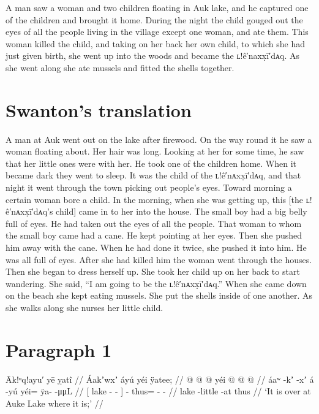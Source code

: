 A man saw a woman and two children floating in Auk lake, and he captured one of the children and brought it home.
During the night the child gouged out the eyes of all the people living in the village except one woman, and ate them.
This woman killed the child, and taking on her back her own child, to which she had just given birth, she went up into the woods and became the ʟ!ê′naxx̣ī′dᴀq.
As she went along she ate mussels and fitted the shells together.

\section{Swanton’s translation}\label{sec:94-swanton-translation}

A man at Auk went out on the lake after firewood.
On the way round it he saw a woman floating about.
Her hair was long.
Looking at her for some time, he saw that her little ones were with her.
He took one of the children home.
When it became dark they went to sleep.
It was the child of the ʟ!ê′nᴀxx̣ī′dᴀq, and that night it went through the town picking out people’s eyes.
Toward morning a certain woman bore a child.
In the morning, when she was getting up, this [the ʟ!ê′nᴀxx̣ī′dᴀq’s child] came in to her into the house.
The small boy had a big belly full of eyes.
He had taken out the eyes of all the people.
That woman to whom the small boy came had a cane.
He kept pointing at her eyes.
Then she pushed him away with the cane.
When he had done it twice, she pushed it into him.
He was all full of eyes.
After she had killed him the woman went through the
houses.
Then she began to dress herself up.
She took her child up on her back to start wandering.
She said, “I am going to be the ʟ!ê′nᴀxx̣ī′dᴀq.”
When she came down on the beach she kept eating mussels.
She put the shells inside of one another.
As she walks along she nurses her little child.

\section{Paragraph 1}\label{sec:94-para-1}

\ex\label{ex:94-1-at-auke-lake}%
%
\begingl
	\glpreamble	Āk!ᵘq!ayu′ yē ỵatî //
	\glpreamble	Áakʼwxʼ áyú yéi ÿatee; //
	\gla	{}  @ {} @ {} {}  @ {}
		yéi @  @ {} @ {} //
	\glb	{} áaʷ -kʼ -xʼ {} á -yú
		yéi= ÿa-  -μμL //
	\glc	{}[ lake - - {}]  -
		thus= -  - //
	\gld	{} lake -little -at {}  {}
		thus  {} {} //
	\glft	‘It is over at Auke Lake where it is;’
		//
\endgl
\xe

